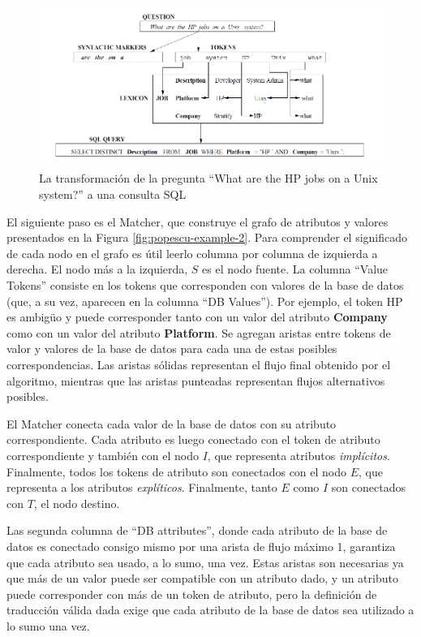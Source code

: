 \begin{figure}
  \centering
    \includegraphics[scale=1.0]{graficos/popescu-example}
  \caption{La transformación de la pregunta ``What are the HP jobs on a Unix system?'' a una consulta SQL}
  \label{fig:popescu-example}
\end{figure}


El siguiente paso es el Matcher, que construye el grafo de atributos y valores presentados en la Figura \ref{fig:popescu-example-2}. Para comprender el significado de cada nodo en el grafo es útil leerlo columna por columna de izquierda a derecha. El nodo más a la izquierda, $S$ es el nodo fuente. La columna ``Value Tokens'' consiste en los tokens que corresponden con valores de la base de datos (que, a su vez, aparecen en la columna ``DB Values''). Por ejemplo, el token HP es ambigüo y puede corresponder tanto con un valor del atributo \textbf{Company} como con un valor del atributo \textbf{Platform}. Se agregan aristas entre tokens de valor y valores de la base de datos para cada una de estas posibles correspondencias. Las aristas sólidas representan el flujo final obtenido por el algoritmo, mientras que las aristas punteadas representan flujos alternativos posibles.

El Matcher conecta cada valor de la base de datos con su atributo correspondiente. Cada atributo es luego conectado con el token de atributo correspondiente y también con el nodo $I$, que representa atributos  \textit{implícitos}. Finalmente, todos los tokens de atributo son conectados con el nodo $E$, que representa a los atributos \textit{explíticos}. Finalmente, tanto $E$ como $I$ son conectados con $T$, el nodo destino.

Las segunda columna de ``DB attributes'', donde cada atributo de la base de datos es conectado consigo mismo por una arista de flujo máximo 1, garantiza que cada atributo sea usado, a lo sumo, una vez. Estas aristas son necesarias ya que más de un valor puede ser compatible con un atributo dado, y un atributo puede corresponder con más de un token de atributo, pero la definición de traducción válida dada exige que cada atributo de la base de datos sea utilizado a lo sumo una vez.


